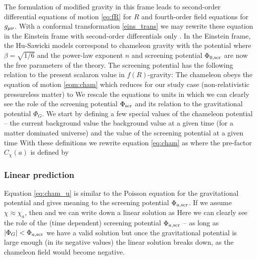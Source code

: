 The formulation of modified gravity in this frame leads to second-order differential equations of motion \eqref{eq:fR} for $R$ and fourth-order field equations for $g_{\mu\nu}$. With a conformal transformation \eqref{eins_trans} we may rewrite these equation in the Einstein frame with second-order differentials only \parencite[see, e.g.,][]{CHIBA20031}. In the Einstein frame, the Hu-Sawicki models correspond to chameleon gravity with the potential
where $\beta=\sqrt{1/6}$ and the power-law exponent $n$ and screening potential $\Phi_{0,\text{\scriptsize scr}}$ are now the free parameters of the theory. The screening potential has the following relation to the present scalaron value in $f(R)$-gravity:
The chameleon obeys the equation of motion \eqref{eom:cham} which reduces for our study case (non-relativistic pressureless matter) to
We rescale the equations to units in which we can clearly see the role of the screening potential $\Phi_{\text{\scriptsize scr}}$ and its relation to the gravitational potential $\Phi_G$. We start by defining a few special values of the chameleon potential -- the current background value
the background value at a given time (for a matter dominated universe)
and the value of the screening potential at a given time
With these definitions we rewrite equation \eqref{eq:cham} as
where the pre-factor $C_\chi(a)$ is defined by
\subsubsection{Linear prediction}
Equation \eqref{eq:cham_u} is similar to the Poisson equation for the gravitational potential and gives meaning to the screening potential $\Phi_{a,\text{\scriptsize scr}}$. If we assume $\chi\approx\chi_a$, then
and we can write down a linear solution as
Here we can clearly see the role of the (time dependent) screening potential $\Phi_{a,\text{\scriptsize scr}}$ -- as long as $|\Phi_G| < \Phi_{a,\text{\scriptsize scr}}$ we have a valid solution but once the gravitational potential is large enough (in its negative values) the linear solution breaks down, as the chameleon field would become negative.


